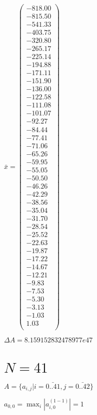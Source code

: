 \documentclass[a4paper,12pt]{article}
\begin{document}
$\bar { x } = \begin{pmatrix}
-818.00 \\
-815.50 \\
-541.33 \\
-403.75 \\
-320.80 \\
-265.17 \\
-225.14 \\
-194.88 \\
-171.11 \\
-151.90 \\
-136.00 \\
-122.58 \\
-111.08 \\
-101.07 \\
-92.27 \\
-84.44 \\
-77.41 \\
-71.06 \\
-65.26 \\
-59.95 \\
-55.05 \\
-50.50 \\
-46.26 \\
-42.29 \\
-38.56 \\
-35.04 \\
-31.70 \\
-28.54 \\
-25.52 \\
-22.63 \\
-19.87 \\
-17.22 \\
-14.67 \\
-12.21 \\
-9.83 \\
-7.53 \\
-5.30 \\
-3.13 \\
-1.03 \\
1.03 \\
\end{pmatrix}
$

$\Delta A = 8.159152832478977e47$



\section{ $N = 41$ }
$A = \{ a _{ i, j } | i = \bar { 0..41 }, j = \bar { 0..42 } \}$

$a _{ 0, 0 } =  \max _i |a _{ i, 0 } ^{ (1 - 1) } | = 1$
\end{document}
